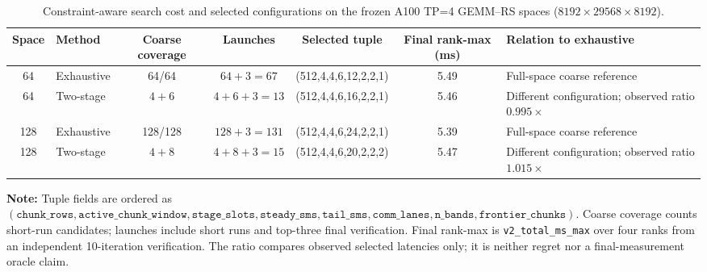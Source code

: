 \begin{table}[t]
  \centering
  \caption{Constraint-aware search cost and selected configurations on the frozen A100 TP=4 GEMM--RS spaces ($8192\times29568\times8192$).}
  \label{tab:constraint_search_cost}
  \scriptsize
  \setlength{\tabcolsep}{2pt}
  \renewcommand{\arraystretch}{1.15}
  \begin{tabular}{c l c c c c l}
  \toprule
  Space & Method & Coarse coverage & Launches & Selected tuple & Final rank-max (ms) & Relation to exhaustive \\
  \midrule
  64 & Exhaustive & 64/64 & $64+3=67$ & (512,4,4,6,12,2,2,1) & 5.49 & Full-space coarse reference \\
  64 & Two-stage & $4+6$ & $4+6+3=13$ & (512,4,4,6,16,2,2,1) & 5.46 & Different configuration; observed ratio $0.995\times$ \\
  128 & Exhaustive & 128/128 & $128+3=131$ & (512,4,4,6,24,2,2,1) & 5.39 & Full-space coarse reference \\
  128 & Two-stage & $4+8$ & $4+8+3=15$ & (512,4,4,6,20,2,2,2) & 5.47 & Different configuration; observed ratio $1.015\times$ \\
  \bottomrule
  \end{tabular}
  \par\smallskip
  \begin{minipage}{0.97\linewidth}
  \footnotesize
  \textbf{Note:} Tuple fields are ordered as $(\texttt{chunk\_rows}, \texttt{active\_chunk\_window}, \texttt{stage\_slots}, \texttt{steady\_sms}, \texttt{tail\_sms}, \texttt{comm\_lanes}, \texttt{n\_bands}, \texttt{frontier\_chunks})$. Coarse coverage counts short-run candidates; launches include short runs and top-three final verification. Final rank-max is \texttt{v2\_total\_ms\_max} over four ranks from an independent 10-iteration verification. The ratio compares observed selected latencies only; it is neither regret nor a final-measurement oracle claim.
  \end{minipage}
\end{table}
